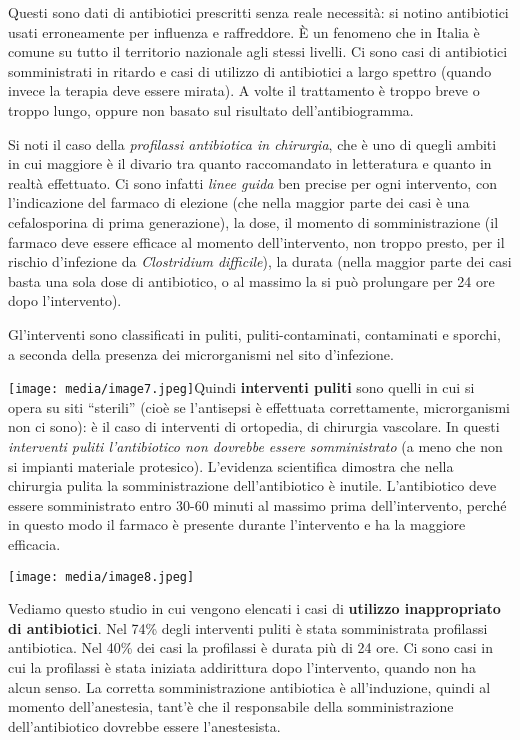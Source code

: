 \documentclass[]{article}
\begin{document}
Questi sono dati di antibiotici prescritti senza reale necessità: si
notino antibiotici usati erroneamente per influenza e raffreddore. È un
fenomeno che in Italia è comune su tutto il territorio nazionale agli
stessi livelli. Ci sono casi di antibiotici somministrati in ritardo e
casi di utilizzo di antibiotici a largo spettro (quando invece la
terapia deve essere mirata). A volte il trattamento è troppo breve o
troppo lungo, oppure non basato sul risultato dell'antibiogramma.

Si noti il caso della \emph{\emph{profilassi antibiotica in chirurgia}},
che è uno di quegli ambiti in cui maggiore è il divario tra quanto
raccomandato in letteratura e quanto in realtà effettuato. Ci sono
infatti \emph{linee guida} ben precise per ogni intervento, con
l'indicazione del farmaco di elezione (che nella maggior parte dei casi
è una cefalosporina di prima generazione), la dose, il momento di
somministrazione (il farmaco deve essere efficace al momento
dell'intervento, non troppo presto, per il rischio d'infezione da
\emph{Clostridium difficile}), la durata (nella maggior parte dei casi
basta una sola dose di antibiotico, o al massimo la si può prolungare
per 24 ore dopo l'intervento).

Gl'interventi sono classificati in puliti, puliti-contaminati,
contaminati e sporchi, a seconda della presenza dei microrganismi nel
sito d'infezione.

\texttt{[image: media/image7.jpeg]}Quindi
\textbf{interventi puliti} sono quelli in cui si opera su siti
``sterili'' (cioè se l'antisepsi è effettuata correttamente,
microrganismi non ci sono): è il caso di interventi di ortopedia, di
chirurgia vascolare. In questi \emph{interventi puliti l'antibiotico non
dovrebbe essere somministrato} (a meno che non si impianti materiale
protesico). L'evidenza scientifica dimostra che nella chirurgia pulita
la somministrazione dell'antibiotico è inutile. L'antibiotico deve
essere somministrato entro 30-60 minuti al massimo prima
dell'intervento, perché in questo modo il farmaco è presente durante
l'intervento e ha la maggiore efficacia.

\texttt{[image: media/image8.jpeg]}

Vediamo questo studio in cui vengono elencati i casi di \textbf{utilizzo
inappropriato di antibiotici}. Nel 74\% degli interventi puliti è stata
somministrata profilassi antibiotica. Nel 40\% dei casi la profilassi è
durata più di 24 ore. Ci sono casi in cui la profilassi è stata iniziata
addirittura dopo l'intervento, quando non ha alcun senso. La corretta
somministrazione antibiotica è all'induzione, quindi al momento
dell'anestesia, tant'è che il responsabile della somministrazione
dell'antibiotico dovrebbe essere l'anestesista.
\end{document}
